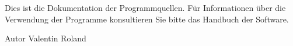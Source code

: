 Dies ist die Dokumentation der Programmquellen. Für Informationen über die Verwendung der Programme konsultieren Sie bitte das Handbuch der Software.

\begin{DoxyAuthor}{Autor}
Valentin Roland 
\end{DoxyAuthor}
